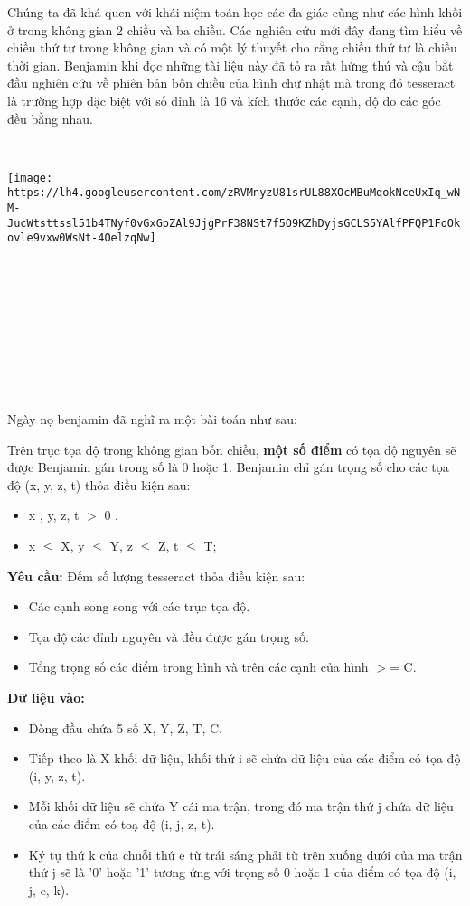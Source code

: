 

Chúng ta đã khá quen với khái niệm toán học các đa giác cũng như các hình khối ở trong không gian 2 chiều và ba chiều. Các nghiên cứu mới đây đang tìm hiểu về chiều thứ tư trong không gian và có một lý thuyết cho rằng chiều thứ tư là chiều thời gian. Benjamin khi đọc những tài liệu này đã tỏ ra rất hứng thú và cậu bắt đầu nghiên cứu về phiên bản bốn chiều của hình chữ nhật mà trong đó tesseract là trường hợp đặc biệt với số đỉnh là 16 và kích thước các cạnh, độ đo các góc đều bằng nhau.

 


\texttt{[image: https://lh4.googleusercontent.com/zRVMnyzU81srUL88XOcMBuMqokNceUxIq\_wNM-JucWtsttssl51b4TNyf0vGxGpZAl9JjgPrF38NSt7f5O9KZhDyjsGCLS5YAlfPFQP1FoOkovle9vxw0WsNt-4OelzqNw]}

 

 

 

 

 

Ngày nọ benjamin đã nghĩ ra một bài toán như sau:

Trên trục tọa độ trong không gian bốn chiều, \textbf{ một số điểm } có tọa độ nguyên sẽ được Benjamin gán trong số là 0 hoặc 1. Benjamin chỉ gán trọng số cho các tọa độ (x, y, z, t) thỏa điều kiện sau:
\begin{itemize}
	\item 

x , y, z, t $>$ 0 .
	\item 

x  $\le$  X, y  $\le$  Y, z  $\le$  Z, t  $\le$  T;
\end{itemize}

\textbf{Yêu cầu: } Đếm số lượng tesseract thỏa điều kiện sau:
\begin{itemize}
	\item 

Các cạnh song song với các trục tọa độ.
	\item 

Tọa độ các đỉnh nguyên và đều được gán trọng số.
	\item 

Tổng trọng số các điểm trong hình và trên các cạnh của hình $>$= C.
\end{itemize}

\textbf{Dữ liệu vào: }
\begin{itemize}
	\item 

Dòng đầu chứa 5 số X, Y, Z, T, C.
	\item 

Tiếp theo là X khối dữ liệu, khối thứ i sẽ chứa dữ liệu của các điểm có tọa độ (i, y, z, t).
	\item 

Mỗi khối dữ liệu sẽ chứa Y cái ma trận, trong đó ma trận thứ j chứa dữ liệu của các điểm có toạ độ (i, j, z, t).
	\item 

Ký tự thứ k của chuỗi thứ e từ trái sáng phải từ trên xuống dưới của ma trận thứ j sẽ là '0' hoặc '1' tương ứng với trọng số 0 hoặc 1 của điểm có tọa độ (i, j, e, k).
\end{itemize}

